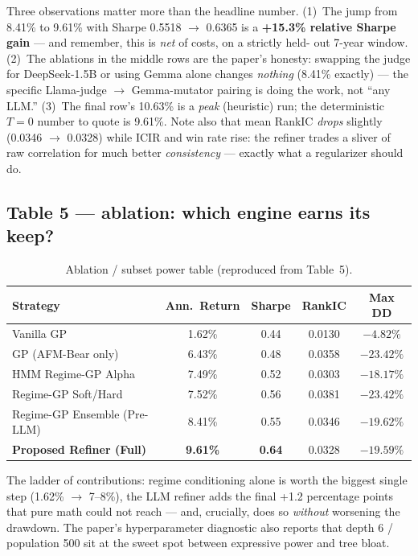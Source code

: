 \documentclass[11pt,a4paper]{article}
\begin{document}
\begin{plaineng}
Three observations matter more than the headline number. (1)~The jump from
8.41\% to 9.61\% with Sharpe 0.5518 $\to$ 0.6365 is a \textbf{+15.3\% relative
Sharpe gain} --- and remember, this is \emph{net} of costs, on a strictly held-
out 7-year window. (2)~The ablations in the middle rows are the paper's
honesty: swapping the judge for DeepSeek-1.5B or using Gemma alone changes
\emph{nothing} (8.41\% exactly) --- the specific Llama-judge $\rightarrow$
Gemma-mutator pairing is doing the work, not ``any LLM.'' (3)~The final row's
10.63\% is a \emph{peak} (heuristic) run; the deterministic $T=0$ number to
quote is 9.61\%. Note also that mean RankIC \emph{drops} slightly (0.0346 $\to$
0.0328) while ICIR and win rate rise: the refiner trades a sliver of raw
correlation for much better \emph{consistency} --- exactly what a regularizer
should do.
\end{plaineng}

\subsection{Table 5 --- ablation: which engine earns its keep?}

\begin{table}[H]
\centering\small
\caption{Ablation / subset power table (reproduced from Table~5).}
\label{tab:ablation}
\begin{tabular}{@{}lcccc@{}}
\toprule
\textbf{Strategy} & \textbf{Ann.\ Return} & \textbf{Sharpe} &
\textbf{RankIC} & \textbf{Max DD} \\
\midrule
Vanilla GP                     & 1.62\%  & 0.44 & 0.0130 & $-4.82\%$  \\
GP (AFM-Bear only)             & 6.43\%  & 0.48 & 0.0358 & $-23.42\%$ \\
HMM Regime-GP Alpha            & 7.49\%  & 0.52 & 0.0303 & $-18.17\%$ \\
Regime-GP Soft/Hard            & 7.52\%  & 0.56 & 0.0381 & $-23.42\%$ \\
Regime-GP Ensemble (Pre-LLM)   & 8.41\%  & 0.55 & 0.0346 & $-19.62\%$ \\
\textbf{Proposed Refiner (Full)} & \textbf{9.61\%} & \textbf{0.64} & 0.0328 & $-19.59\%$ \\
\bottomrule
\end{tabular}
\end{table}

\begin{plaineng}
The ladder of contributions: regime conditioning alone is worth the biggest
single step (1.62\% $\to$ 7--8\%), the LLM refiner adds the final +1.2
percentage points that pure math could not reach --- and, crucially, does so
\emph{without} worsening the drawdown. The paper's hyperparameter diagnostic
also reports that depth 6 / population 500 sit at the sweet spot between
expressive power and tree bloat.
\end{plaineng}
\end{document}
